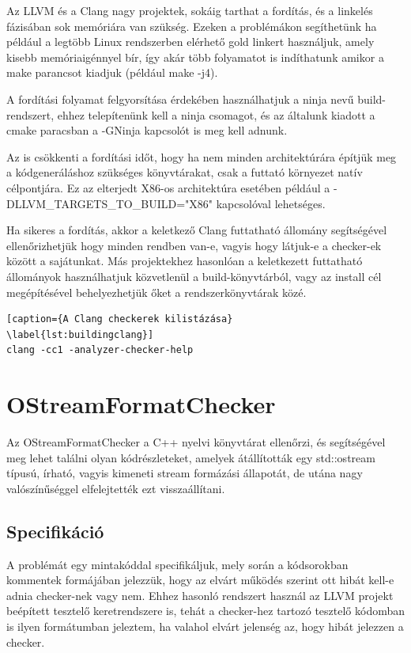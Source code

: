 \documentclass[a4paper,12pt]{report}
\begin{document}
Az LLVM és a Clang nagy projektek, sokáig tarthat a fordítás, és a linkelés fázisában sok memóriára van szükség. Ezeken a problémákon segíthetünk ha például a legtöbb Linux rendszerben elérhető gold linkert használjuk, amely kisebb memóriaigénnyel bír, így akár több folyamatot is indíthatunk amikor a make parancsot kiadjuk (például make -j4).

A fordítási folyamat felgyorsítása érdekében használhatjuk a ninja nevű build-rendszert, ehhez telepítenünk kell a ninja csomagot, és az általunk kiadott a cmake paracsban a -GNinja kapcsolót is meg kell adnunk.

Az is csökkenti a fordítási időt, hogy ha nem minden architektúrára építjük meg a kódgeneráláshoz szükséges könyvtárakat, csak a futtató környezet natív célpontjára. Ez az elterjedt X86-os architektúra esetében például a -DLLVM\_TARGETS\_TO\_BUILD="X86" kapcsolóval lehetséges.

Ha sikeres a fordítás, akkor a keletkező Clang futtatható állomány segítségével ellenőrizhetjük hogy minden rendben van-e, vagyis hogy látjuk-e a checker-ek között a sajátunkat. Más projektekhez hasonlóan a keletkezett futtatható állományok használhatjuk közvetlenül a build-könyvtárból, vagy az install cél megépítésével behelyezhetjük őket a rendszerkönyvtárak közé.

\begin{lstlisting}[caption={A Clang checkerek kilistázása}
\label{lst:buildingclang}]
clang -cc1 -analyzer-checker-help
\end{lstlisting}

\section{OStreamFormatChecker}
Az OStreamFormatChecker a C++ nyelvi könyvtárat ellenőrzi, és segítségével meg lehet találni olyan kódrészleteket, amelyek átállították egy std::ostream típusú, írható, vagyis kimeneti stream formázási állapotát, de utána nagy valószínűséggel elfelejtették ezt visszaállítani.

\subsection{Specifikáció}
A problémát egy mintakóddal specifikáljuk, mely során a kódsorokban kommentek formájában jelezzük, hogy az elvárt működés szerint ott hibát kell-e adnia checker-nek vagy nem. Ehhez hasonló rendszert használ az LLVM projekt beépített tesztelő keretrendszere is, tehát a checker-hez tartozó tesztelő kódomban is ilyen formátumban jeleztem, ha valahol elvárt jelenség az, hogy hibát jelezzen a checker.
\end{document}
